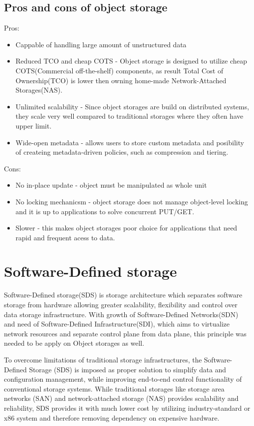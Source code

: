     \subsection{Pros and cons of object storage}
    Pros:
    \begin{itemize}
        \item{Cappable of handling large amount of unstructured data}
        \item{Reduced TCO and cheap COTS - Object storage is designed to utilize cheap COTS(Commercial off-the-shelf) components, as result Total Cost of Ownership(TCO) is lower then owning home-made Network-Attached Storages(NAS)\cite{networkStorage}.}
        \item{Unlimited scalability - Since object storages are build on distributed systems, they scale very well compared to traditional storages where they often have upper limit.\cite{openstackObjectStorage}}
        \item{Wide-open metadata - allows users to store custom metadata and posibility of createing metadata-driven policies, such as compression and tiering.}
    \end{itemize}
    Cons:
    \begin{itemize}
        \item{No in-place update - object must be manipulated as whole unit}
        \item{No locking mechanicsm - object storage does not manage object-level locking and it is up to applications to solve concurrent PUT/GET.}
        \item{Slower - this makes object storages poor choice for applications that need rapid and frequent acess to data.}
    \end{itemize}

\section{Software-Defined storage}
    Software-Defined storage(SDS) is storage architecture which separates software storage from hardware allowing greater scalability, flexibility and control over data storage infrastructure.
    With growth of Software-Defined Networks(SDN) and need of Software-Defined Infrastructure(SDI), which aims to virtualize network resources and separate control plane from data plane, this principle was needed to be apply on Object storages as well\cite{sdsSDSMultiTenantEnv}.

    To overcome limitations of traditional storage infrastructures, the Software-Defined Storage (SDS) is imposed as proper solution to simplify data and configuration management, while improving end-to-end control functionality of conventional storage systems\cite{sdsSurvey}. While traditional storages like  storage area networks (SAN) and network-attached storage (NAS) provides scalability and reliability, SDS provides it with much lower cost by utilizing industry-standard or x86 system and therefore removing dependency on expensive hardware\cite{sdsWPRedHatSDS}.

